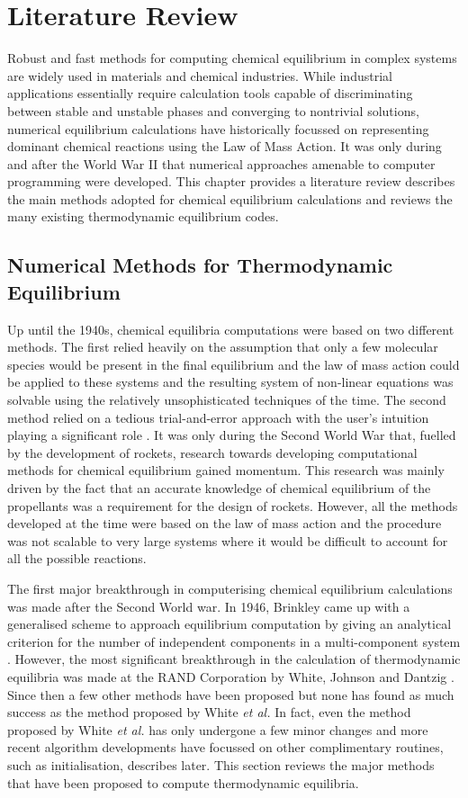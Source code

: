 \chapter{Literature Review} \label{chap:litreview}

	Robust and fast methods for computing chemical equilibrium in complex systems are widely used in materials and chemical industries. While industrial applications essentially require calculation tools capable of discriminating between stable and unstable phases and converging to nontrivial solutions, numerical equilibrium calculations have historically focussed on representing dominant chemical reactions using the Law of Mass Action. It was only during and after the World War {II} that numerical approaches amenable to computer programming were developed. This chapter provides a literature review describes the main methods adopted for chemical equilibrium calculations and reviews the many existing thermodynamic equilibrium codes.

\section{Numerical Methods for Thermodynamic Equilibrium}
	Up until the 1940s, chemical equilibria computations were based on two different methods. The first relied heavily on the assumption that only a few molecular species would be present in the final equilibrium and the law of mass action could be applied to these systems and the resulting system of non-linear equations was solvable using the relatively unsophisticated techniques of the time. The second method relied on a tedious trial-and-error approach with the user's intuition playing a significant role \cite{vanZeggeren11}. It was only during the Second World War that, fuelled by the development of rockets, research towards developing computational methods for chemical equilibrium gained momentum. This research was mainly driven by the fact that an accurate knowledge of chemical equilibrium of the propellants was a requirement for the design of rockets. However, all the methods developed at the time were based on the law of mass action and the procedure was not scalable to very large systems where it would be difficult to account for all the possible reactions.

	The first major breakthrough in computerising chemical equilibrium calculations was made after the Second World war. In 1946, Brinkley came up with a generalised scheme to approach equilibrium computation by giving an analytical criterion for the number of independent components in a multi-component system \cite{vanZeggeren11}. However, the most significant breakthrough in the calculation of thermodynamic equilibria was made at the RAND Corporation by White, Johnson and Dantzig  \cite{White:58}. Since then a few other methods have been proposed but none has found as much success as the method proposed by White \textit{et al.} In fact, even the method proposed by White \textit{et al.} has only undergone a few minor changes and more recent algorithm developments have focussed on other complimentary routines, such as initialisation, describes later. This section reviews the major methods that have been proposed to compute thermodynamic equilibria.

